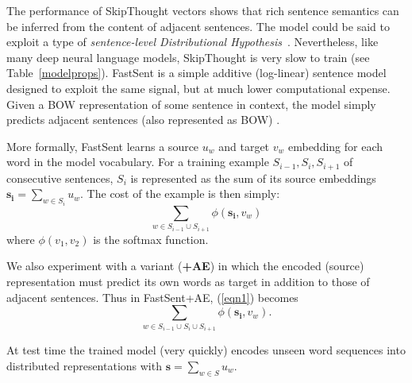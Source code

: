 \vspace{5pt} The performance of SkipThought vectors shows that rich sentence semantics can be inferred from the content of adjacent sentences. The model could be said to exploit a type of \emph{sentence-level Distributional Hypothesis}~\cite{harris1954distributional,polajnar2015exploration}. Nevertheless, like many deep neural language models, SkipThought is very slow to train (see Table~\ref{modelprops}). FastSent is a simple additive (log-linear) sentence model designed to exploit the same signal, but at much lower computational expense. Given a BOW representation of some sentence in context, the model simply predicts adjacent sentences (also represented as BOW) .

More formally, FastSent learns a source \(u_w\) and target \(v_w\) embedding for each word in the model vocabulary. For a training example  \(S_{i-1},S_i,S_{i+1}\) of consecutive sentences, \(S_i\) is represented as the sum of its source embeddings \( \mathbf{s_i} = \sum_{w \in S_i} u_w \). The cost of the example is then simply:
\begin{equation} \label{eqn1}
 \sum_{w \in S_{i-1} \cup S_{i+1}} \phi(\mathbf{s_i},v_w) 
 \end{equation}
 where \( \phi(v_1,v_2) \) is the softmax function.  

We also experiment with a variant ({\bf+AE}) in which the encoded (source) representation must predict its own words as target in addition to those of adjacent sentences. Thus in FastSent+AE, (\ref{eqn1}) becomes  \begin{equation} 
\sum_{w \in S_{i-1} \cup S_{i} \cup S_{i+1}} \phi(\mathbf{s_i},v_w).
\end{equation}

\noindent At test time the trained model (very quickly) encodes unseen word sequences into distributed representations with \( \mathbf{s} = \sum_{w \in S} u_w \).

